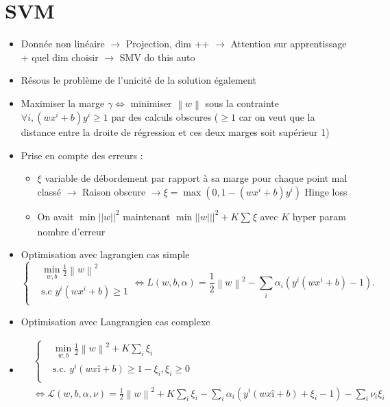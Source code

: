 \documentclass{article}
\theoremstyle{plain}%
\theoremstyle{definition}
\theoremstyle{remark}
\begin{document}
\section{SVM}
\begin{itemize}
    \item Donnée non linéaire $\rightarrow$ Projection, dim ++ $\rightarrow$ Attention sur apprentissage + quel dim choisir $\rightarrow$ SMV do this auto
    \item Résous le problème de l'unicité de la solution également
    \item Maximiser la marge $ \gamma  \Leftrightarrow $ minimiser $ \left\| w \right\| $ sous la contrainte $ \forall i, (wx^i + b)y^i \geq 1 $ par des calculs obscures ($ \geq 1 $ car on veut que la distance entre la droite de régression et ces deux marges soit supérieur 1)
    \item Prise en compte des erreurs : \begin{itemize}
        \item $ \xi  $ variable de débordement par rapport à sa marge pour chaque point mal classé $\rightarrow$ Raison obscure $\rightarrow \xi = \max (0, 1 - (wx^i + b) y^i) $ Hinge loss
        \item On avait $\min ||w||^2$ maintenant $\min ||w|||^2 + K \sum_{}^{}\xi $ avec $K$ hyper param nombre d'erreur
    \end{itemize}
    \item Optimisation avec lagrangien cas simple
    \[
        \begin{cases}
        & \min _{w,b} \frac{1}{2}\left\| w \right\| ^2\\
        &\text{s.c } y^i (wx^i + b) \geq 1\\
        \end{cases} 
        \Leftrightarrow L(w, b, \alpha) = \frac{1}{2} \left\| w \right\| ^2 - \sum_{i}^{}\alpha _i (y^i (wx^i + b) - 1)
    .\]
    \item Optimisation avec Langrangien cas complexe 
    \item \begin{align*}
        &\begin{cases}
            &\min _{w,b} \frac{1}{2}\left\| w \right\| ^2 + K \sum_{i}^{}\xi _i \\
            &\text{s.c. } y^i (wxî + b) \geq 1 - \xi _i, \xi _i \geq 0 \\
        \end{cases} \\ 
        &\Leftrightarrow \mathcal{L}(w, b, \alpha , \nu ) = \frac{1}{2}\left\| w \right\| ^2 + K \sum_{i}^{} \xi _i - \sum_{i}^{}\alpha _i (y^i(w x î + b) + \xi _i - 1) - \sum_{i}^{}\nu _i \xi _i 
    \end{align*}
        
\end{itemize}
\end{document}

